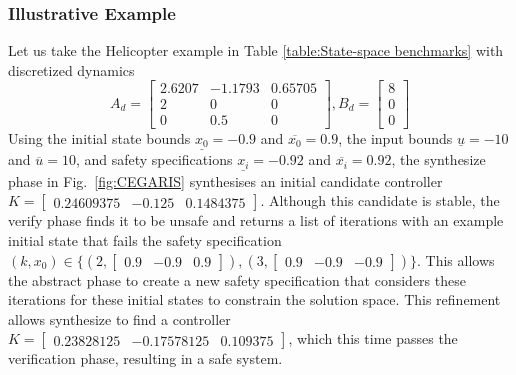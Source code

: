 \documentclass[runningheads,a4paper]{llncs}
\begin{document}
\subsubsection{Illustrative Example}
%
Let us take the Helicopter example in Table \ref{table:State-space benchmarks} with discretized dynamics
$$A_d = \left[\begin{array}{ccc}2.6207&-1.1793&0.65705\\2&0&0\\0&0.5&0\end{array}\right], B_d = \left [\begin{array}{c}8\\0\\0\end{array}\right]$$
Using the initial state bounds $\underline{x_{0}}=-0.9$ and $\overline{x_{0}}=0.9$, the input bounds $\underline{u}=-10$ and $\overline{u}=10$, and safety specifications 
$\underline{x_{i}}=-0.92$ and $\overline{x_{i}}=0.92$, the {\sc synthesize} phase in Fig.~\ref{fig:CEGARIS} synthesises an initial candidate controller $K=[\begin{array}{ccc}0.24609375&-0.125&0.1484375\end{array}]$.
Although this candidate is stable, the {\sc verify} phase finds it to be unsafe and returns a list of iterations with an example initial state that fails the safety specification
$(k,x_0) \in \{ (2, [\begin{array}{ccc}0.9&-0.9&0.9\end{array}]), (3, [\begin{array}{ccc}0.9&-0.9&-0.9\end{array}])\}$.
This allows the {\sc abstract} phase to create a new safety specification that considers these iterations for these initial states to constrain the solution space.
This refinement allows {\sc synthesize} to find a controller $K=[\begin{array}{ccc}0.23828125&-0.17578125&0.109375\end{array}]$, which this time passes the verification phase, resulting in a safe system.

\end{document}
